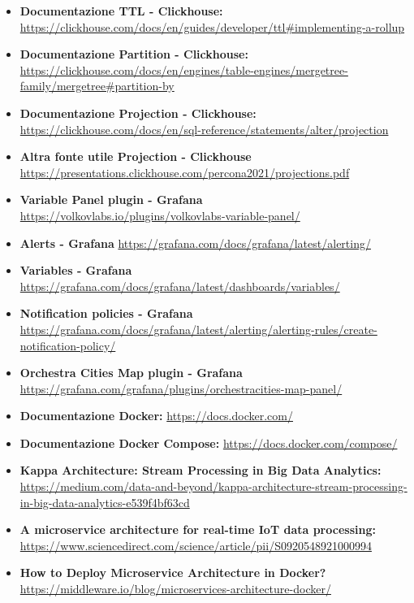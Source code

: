 \begin{itemize}
    \item \textbf{Documentazione TTL - Clickhouse:} \href{https://clickhouse.com/docs/en/guides/developer/ttl#implementing-a-rollup}{https://clickhouse.com/docs/en/guides/developer/ttl\#implementing-a-rollup}
    \item \textbf{Documentazione Partition - Clickhouse:} \href{https://clickhouse.com/docs/en/engines/table-engines/mergetree-family/mergetree#partition-by}{https://clickhouse.com/docs/en/engines/table-engines/mergetree-family/mergetree\#partition-by}
    \item \textbf{Documentazione Projection - Clickhouse:} \href{https://clickhouse.com/docs/en/sql-reference/statements/alter/projection}{https://clickhouse.com/docs/en/sql-reference/statements/alter/projection}
    \item \textbf{Altra fonte utile Projection - Clickhouse} \href{https://presentations.clickhouse.com/percona2021/projections.pdf}{https://presentations.clickhouse.com/percona2021/projections.pdf}
    \item  \textbf{Variable Panel plugin - Grafana} \href{https://volkovlabs.io/plugins/volkovlabs-variable-panel/}{https://volkovlabs.io/plugins/volkovlabs-variable-panel/}
    \item  \textbf{Alerts - Grafana} \href{https://grafana.com/docs/grafana/latest/alerting/}{https://grafana.com/docs/grafana/latest/alerting/}
    \item \textbf{Variables - Grafana} \href{https://grafana.com/docs/grafana/latest/dashboards/variables/}{https://grafana.com/docs/grafana/latest/dashboards/variables/}
    \item  \textbf{Notification policies - Grafana} \href{https://grafana.com/docs/grafana/latest/alerting/alerting-rules/create-notification-policy/}{https://grafana.com/docs/grafana/latest/alerting/alerting-rules/create-notification-policy/}
    \item  \textbf{Orchestra Cities Map plugin - Grafana} \href{https://grafana.com/grafana/plugins/orchestracities-map-panel/}{https://grafana.com/grafana/plugins/orchestracities-map-panel/}
    \item \textbf{Documentazione Docker:} \href{https://docs.docker.com/}{https://docs.docker.com/}
    \item \textbf{Documentazione Docker Compose:} \href{https://docs.docker.com/compose/}{https://docs.docker.com/compose/}
    \item \textbf{Kappa Architecture: Stream Processing in Big Data Analytics:} \href{https://medium.com/data-and-beyond/kappa-architecture-stream-processing-in-big-data-analytics-e539f4bf63cd}{https://medium.com/data-and-beyond/kappa-architecture-stream-processing-in-big-data-analytics-e539f4bf63cd}
    \item  \textbf{A microservice architecture for real-time IoT data processing:}  \href{https://www.sciencedirect.com/science/article/pii/S0920548921000994}{https://www.sciencedirect.com/science/article/pii/S0920548921000994}
    \item \textbf{How to Deploy Microservice Architecture in Docker?} \href{https://middleware.io/blog/microservices-architecture-docker/}{https://middleware.io/blog/microservices-architecture-docker/}
\end{itemize}
